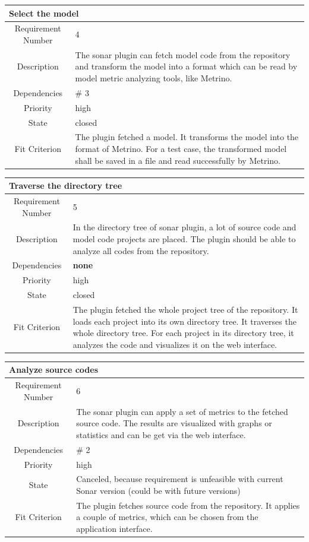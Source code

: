 \begin{longtable}{|c|p{10cm}|}
\hline 
\multicolumn{2}{|l|}{\textbf{Select the model}} \\ 
\hline 
Requirement Number & 4 \\ \hline 
Description & The sonar plugin can fetch model code from the repository and transform the model into a format which can be read by model metric analyzing tools, like Metrino. \\ \hline 
Dependencies & \# 3 \\ \hline 
Priority & high \\ \hline 
State & closed \\ \hline 
Fit Criterion & The plugin fetched a model. It transforms the model into the format of Metrino. For a test case, the transformed model shall be saved in a file and read successfully by Metrino. \\ \hline
\end{longtable}

\begin{longtable}{|c|p{10cm}|}
\hline 
\multicolumn{2}{|l|}{\textbf{Traverse the directory tree}} \\ 
\hline 
Requirement Number & 5 \\ \hline 
Description & In the directory tree of sonar plugin, a lot of source code and model code projects are placed. The plugin should be able to analyze all codes from the repository. \\ \hline 
Dependencies & \textbf{none} \\ \hline 
Priority & high \\ \hline 
State & closed \\ \hline 
Fit Criterion & The plugin fetched the whole project tree of the repository. It loads each project into its own directory tree. It traverses the whole directory tree. For each project in its directory tree, it analyzes the code and visualizes it on the web interface. \\ \hline
\end{longtable}

\begin{longtable}{|c|p{10cm}|}
\hline 
\multicolumn{2}{|l|}{\textbf{Analyze source codes}} \\ 
\hline 
Requirement Number & 6 \\ \hline 
Description & The sonar plugin can apply a set of metrics to the fetched source code. The results are visualized with graphs or statistics and can be get via the web interface. \\ \hline 
Dependencies & \# 2 \\ \hline 
Priority & high \\ \hline 
State & Canceled, because requirement is unfeasible with current Sonar version (could be with future versions) \\ \hline 
Fit Criterion & The plugin fetches source code from the repository. It applies a couple of metrics, which can be chosen from the application interface. \\ \hline
\end{longtable}

